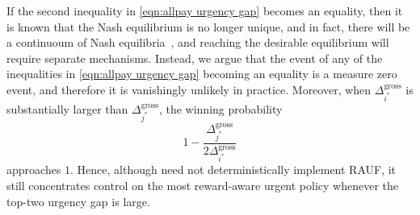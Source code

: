 If the second inequality in \eqref{eqn:allpay urgency gap} becomes an equality, then it is known that the Nash equilibrium is no longer unique, and in fact, there will be a continuoum of Nash equilibria~\cite{baye1996all}, and reaching the desirable equilibrium will require separate mechanisms.
Instead, we argue that the event of any of the inequalities in \eqref{eqn:allpay urgency gap} becoming an equality is a measure zero event, and therefore it is vanishingly unlikely in practice.
Moreover, when $\Delta_{i^*}^{\mathrm{gross}}$ is substantially larger than $\Delta_{j^*}^{\mathrm{gross}}$, the winning probability
\[
1-\frac{\Delta_{j^*}^{\mathrm{gross}}}{2\Delta_{i^*}^{\mathrm{gross}}}
\]
approaches $1$.
Hence, although \allpay need not deterministically implement RAUF, it still concentrates control on the most reward-aware urgent policy whenever the top-two urgency gap is large.

